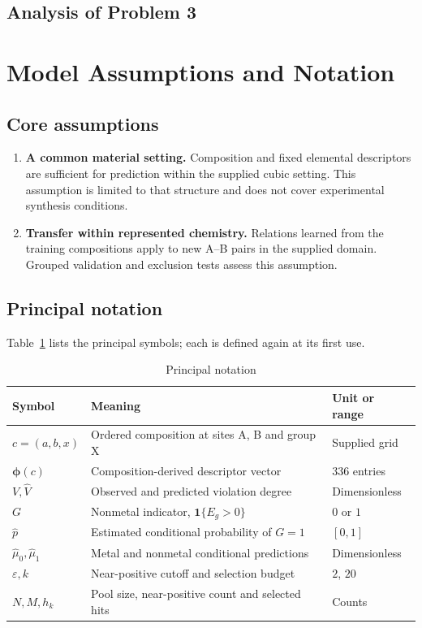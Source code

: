 \subsection{Analysis of Problem 3}

\section{Model Assumptions and Notation}
\subsection{Core assumptions}
\begin{enumerate}
  \item \textbf{A common material setting.} Composition and fixed elemental descriptors are sufficient for prediction within the supplied cubic setting. This assumption is limited to that structure and does not cover experimental synthesis conditions.
  \item \textbf{Transfer within represented chemistry.} Relations learned from the training compositions apply to new A--B pairs in the supplied domain. Grouped validation and exclusion tests assess this assumption.
\end{enumerate}

\subsection{Principal notation}
Table~\ref{tab:notation} lists the principal symbols; each is defined again at its first use.
\par
\begin{table}[H]
\centering
\caption{Principal notation}\label{tab:notation}
\begin{tabularx}{\linewidth}{@{}l X l@{}}
\toprule
Symbol & Meaning & Unit or range\\
\midrule
$c=(a,b,x)$ & Ordered composition at sites A, B and group X & Supplied grid\\
$\boldsymbol\phi(c)$ & Composition-derived descriptor vector & 336 entries\\
$V,\widehat V$ & Observed and predicted violation degree & Dimensionless\\
$G$ & Nonmetal indicator, $\mathbf{1}\{E_g>0\}$ & $0$ or $1$\\
$\widehat p$ & Estimated conditional probability of $G=1$ & $[0,1]$\\
$\widehat\mu_0,\widehat\mu_1$ & Metal and nonmetal conditional predictions & Dimensionless\\
$\varepsilon,k$ & Near-positive cutoff and selection budget & $2$, $20$\\
$N,M,h_k$ & Pool size, near-positive count and selected hits & Counts\\
\bottomrule
\end{tabularx}
\end{table}
\par
\FloatBarrier
